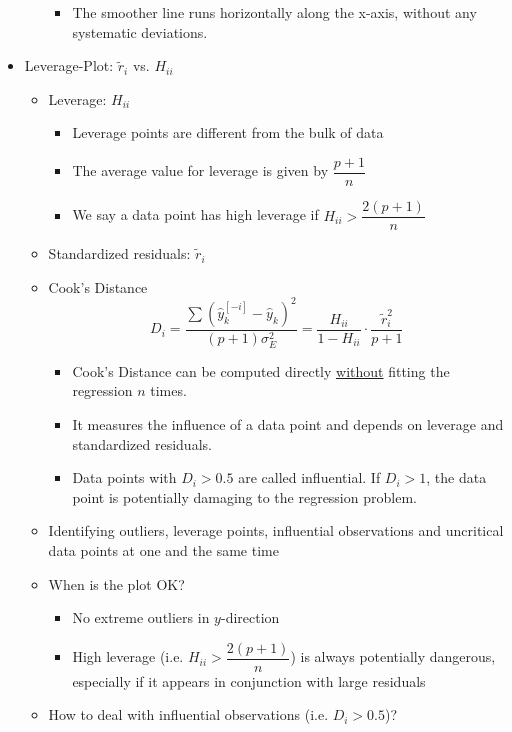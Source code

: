 \documentclass[a4paper]{article}
\begin{document}
\begin{itemize}
\begin{itemize}
\begin{itemize}
            \item The smoother line runs horizontally along the x-axis, without any systematic deviations.
        \end{itemize}
    \end{itemize}
    \item Leverage-Plot: $\tilde{r}_i$ vs. $H_{ii}$
    \begin{itemize}
        \item Leverage: $H_{ii}$
        \begin{itemize}
            \item Leverage points are different from the bulk of data
            \item The average value for leverage is given by $\dfrac{p+1}{n}$
            \item We say a data point has high leverage if $H_{ii}>\dfrac{2(p+1)}{n}$
        \end{itemize}
        \item Standardized residuals: $\tilde{r}_i$
        \item Cook's Distance
        \[D_i=\dfrac{\sum(\hat{y}_k^{[-i]}-\hat{y}_k)^2}{(p+1)\sigma_E^2}=\dfrac{H_{ii}}{1-H_{ii}}\cdot\dfrac{\tilde{r}_i^2}{p+1} \]
        \begin{itemize}
            \item Cook's Distance can be computed directly \underline{without} fitting the regression $n$ times.
            \item It measures the influence of a data point and depends on leverage and standardized residuals.
            \item Data points with $D_i>0.5$ are called influential. If $D_i>1$, the data point is potentially damaging to the regression problem.
        \end{itemize}
        \item Identifying outliers, leverage points, influential observations and uncritical data points at one and the same time
        \item When is the plot OK?
        \begin{itemize}
            \item No extreme outliers in $y$-direction
            \item High leverage (i.e. $H_{ii}>\dfrac{2(p+1)}{n}$) is always potentially dangerous, especially if it appears in conjunction with large residuals
        \end{itemize}
        \item How to deal with influential observations (i.e. $D_i>0.5$)?

\end{itemize}
\end{itemize}
\end{document}
